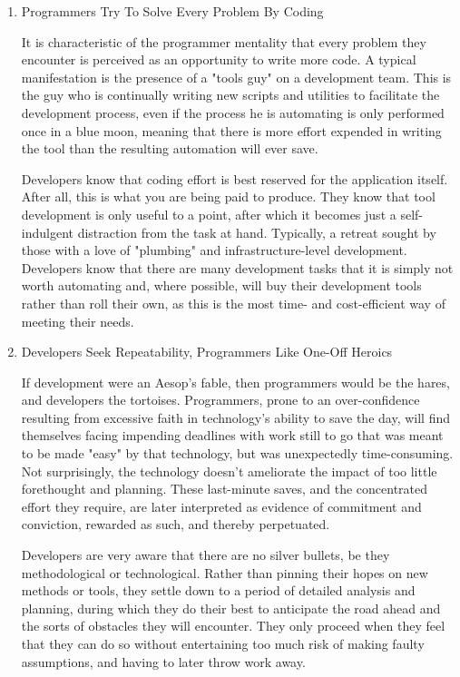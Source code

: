 \documentclass{article}
\begin{document}
\begin{enumerate}
\item Programmers Try To Solve Every Problem By Coding
\label{sec:orgheadline128}

It is characteristic of the programmer mentality that every problem they
encounter is perceived as an opportunity to write more code. A typical
manifestation is the presence of a "tools guy" on a development team.
This is the guy who is continually writing new scripts and utilities to
facilitate the development process, even if the process he is automating
is only performed once in a blue moon, meaning that there is more effort
expended in writing the tool than the resulting automation will ever
save.

Developers know that coding effort is best reserved for the application
itself. After all, this is what you are being paid to produce. They know
that tool development is only useful to a point, after which it becomes
just a self-indulgent distraction from the task at hand. Typically, a
retreat sought by those with a love of "plumbing" and
infrastructure-level development. Developers know that there are many
development tasks that it is simply not worth automating and, where
possible, will buy their development tools rather than roll their own,
as this is the most time- and cost-efficient way of meeting their needs.

\item Developers Seek Repeatability, Programmers Like One-Off Heroics
\label{sec:orgheadline129}

If development were an Aesop's fable, then programmers would be the
hares, and developers the tortoises. Programmers, prone to an
over-confidence resulting from excessive faith in technology's ability
to save the day, will find themselves facing impending deadlines with
work still to go that was meant to be made "easy" by that technology,
but was unexpectedly time-consuming. Not surprisingly, the technology
doesn't ameliorate the impact of too little forethought and planning.
These last-minute saves, and the concentrated effort they require, are
later interpreted as evidence of commitment and conviction, rewarded as
such, and thereby perpetuated.

Developers are very aware that there are no silver bullets, be they
methodological or technological. Rather than pinning their hopes on new
methods or tools, they settle down to a period of detailed analysis and
planning, during which they do their best to anticipate the road ahead
and the sorts of obstacles they will encounter. They only proceed when
they feel that they can do so without entertaining too much risk of
making faulty assumptions, and having to later throw work away.


\end{enumerate}
\end{document}
